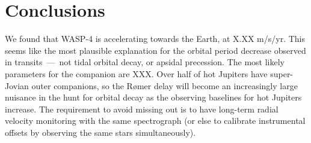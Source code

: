 \documentclass[12pt,twocolumn,tighten]{aastex62}
\begin{document}
\section{Conclusions}
\label{sec:conclusions}

We found that WASP-4 is accelerating towards the Earth, at
X.XX m/s/yr.
This seems like the most plausible explanation for the orbital 
period decrease observed in transits~---~not tidal
orbital decay, or apsidal precession.
The most likely parameters for the companion are XXX.
Over half of hot Jupiters have super-Jovian outer companions,
so the R{\o}mer delay will become an increasingly large nuisance in
the hunt for orbital decay as
the observing baselines for hot Jupiters increase.
The requirement to avoid missing out is to have long-term
radial velocity monitoring with the same spectrograph (or else to
calibrate instrumental offsets by observing the same stars simultaneously).




%
%
\end{document}
